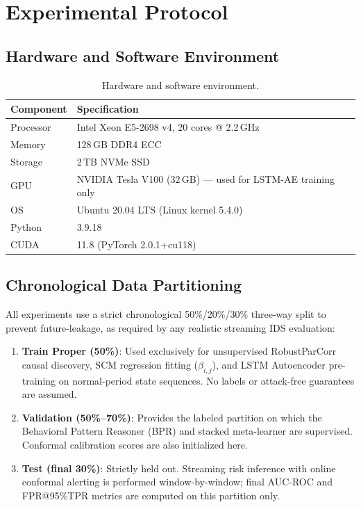 \section{Experimental Protocol}
\label{sec:protocol}

\subsection{Hardware and Software Environment}

\begin{table}[htbp]
\centering
\small
\caption{Hardware and software environment.}
\begin{tabular}{ll}
\toprule
\textbf{Component} & \textbf{Specification} \\
\midrule
Processor    & Intel Xeon E5-2698 v4, 20 cores @ 2.2\,GHz \\
Memory       & 128\,GB DDR4 ECC \\
Storage      & 2\,TB NVMe SSD \\
GPU          & NVIDIA Tesla V100 (32\,GB) — used for LSTM-AE training only \\
OS           & Ubuntu 20.04 LTS (Linux kernel 5.4.0) \\
Python       & 3.9.18 \\
CUDA         & 11.8 (PyTorch 2.0.1+cu118) \\
\bottomrule
\end{tabular}
\label{tab:hardware}
\end{table}

\subsection{Chronological Data Partitioning}

All experiments use a strict chronological 50\%/20\%/30\% three-way split to prevent
future-leakage, as required by any realistic streaming IDS evaluation:

\begin{enumerate}
\item \textbf{Train Proper (50\%)}: Used exclusively for unsupervised RobustParCorr causal
  discovery, SCM regression fitting ($\beta_{i,j}$), and LSTM Autoencoder pre-training on
  normal-period state sequences. No labels or attack-free guarantees are assumed.

\item \textbf{Validation (50\%--70\%)}: Provides the labeled partition on which the
  Behavioral Pattern Reasoner (BPR) and stacked meta-learner are supervised. Conformal
  calibration scores are also initialized here.

\item \textbf{Test (final 30\%)}: Strictly held out. Streaming risk inference with online
  conformal alerting is performed window-by-window; final AUC-ROC and FPR@95\%TPR metrics
  are computed on this partition only.
\end{enumerate}


